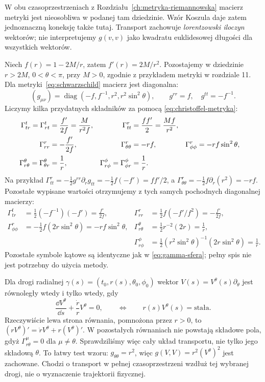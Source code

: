 W obu czasoprzestrzeniach z Rozdziału~\ref{ch:metryka-riemannowska}
macierz metryki jest nieosobliwa w podanej tam
dziedzinie. Wzór Koszula daje zatem jednoznaczną
koneksję także tutaj. Transport zachowuje
\emph{lorentzowski iloczyn} wektorów;
nie interpretujemy $g(v,v)$ jako kwadratu
euklidesowej długości dla wszystkich wektorów.

\begin{przyklad}
\label{prz:koneksja-schwarzschild}
Niech $f(r)=1-2M/r$, zatem $f'(r)=2M/r^2$.
Pozostajemy w dziedzinie $r>2M$, $0<\theta<\pi$,
przy $M>0$, zgodnie z przykładem metryki w rozdziale 11.
Dla metryki~\eqref{eq:schwarzschild}
macierz jest diagonalna:
\[
 (g_{\mu\nu})
 =\operatorname{diag}(-f,f^{-1},r^2,r^2\sin^2\theta),
 \qquad g^{rr}=f,\quad g^{tt}=-f^{-1}.
\]
Liczymy kilka przydatnych składników
za pomocą \eqref{eq:christoffel-metryka}:
\begin{align}\label{eq:gamma-schwarzschild}
 \Gamma^t_{tr}=\Gamma^t_{rt}
   &=\frac{f'}{2f}=\frac{M}{r^2f},
 &\Gamma^r_{tt}&=\frac{ff'}2=\frac{Mf}{r^2},\notag\\
 \Gamma^r_{rr}&=-\frac{f'}{2f},
 &\Gamma^r_{\theta\theta}&=-rf,
 &\Gamma^r_{\phi\phi}&=-rf\sin^2\theta,\\
 \Gamma^\theta_{r\theta}=\Gamma^\theta_{\theta r}
   &=\frac1r,
 &\Gamma^\phi_{r\phi}=\Gamma^\phi_{\phi r}&=\frac1r.
 \notag
\end{align}
Na przykład
$\Gamma^r_{tt}=-\tfrac12g^{rr}\partial_rg_{tt}
=-\tfrac12f(-f')=ff'/2$, a
$\Gamma^r_{\theta\theta}
=-\tfrac12 f\partial_r(r^2)=-rf$.
Pozostałe wypisane wartości otrzymujemy z tych samych
pochodnych diagonalnej macierzy:
\[
 \begin{aligned}
 \Gamma^t_{tr}&=\tfrac12(-f^{-1})(-f')=\frac{f'}{2f},
 &\Gamma^r_{rr}&=\tfrac12f(-f'/f^2)=-\frac{f'}{2f},\\
 \Gamma^r_{\phi\phi}
 &=-\tfrac12f(2r\sin^2\theta)=-rf\sin^2\theta,
 &\Gamma^\theta_{r\theta}
 &=\tfrac12r^{-2}(2r)=\frac1r,\\
 &&\Gamma^\phi_{r\phi}
 &=\tfrac12(r^2\sin^2\theta)^{-1}(2r\sin^2\theta)=\frac1r.
 \end{aligned}
\]
Pozostałe symbole kątowe są identyczne jak
w \eqref{eq:gamma-sfera}; pełny spis nie jest
potrzebny do użycia metody.

Dla drogi radialnej
$\gamma(s)=(t_0,r(s),\theta_0,\phi_0)$
wektor $V(s)=V^\theta(s)\partial_\theta$
jest równoległy wtedy i tylko wtedy, gdy
\[
 \frac{\dd V^\theta}{\dd s}
 +\frac{\dot r}{r}V^\theta=0,
 \qquad\Longleftrightarrow\qquad
 r(s)V^\theta(s)=\text{stała}.
\]
Rzeczywiście lewa strona równania, pomnożona przez $r>0$,
to $(rV^\theta)'=\dot rV^\theta+r(V^\theta)'$.
W pozostałych równaniach nie powstają składowe pola,
gdyż $\Gamma^\mu_{r\theta}=0$ dla $\mu\ne\theta$.
Sprawdziliśmy więc cały układ transportu, nie tylko
jego składową $\theta$.
To łatwy test wzoru: $g_{\theta\theta}=r^2$,
więc $g(V,V)=r^2(V^\theta)^2$ jest zachowane.
Chodzi o transport w pełnej czasoprzestrzeni
wzdłuż tej wybranej drogi, nie o wyznaczenie
trajektorii fizycznej.
\end{przyklad}

